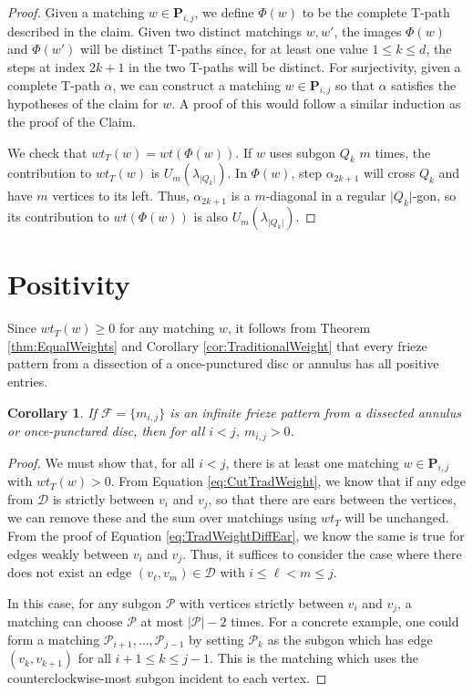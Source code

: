\documentclass[12pt]{article}
\newtheorem{corollary}{Corollary}
\theoremstyle{remark}
\newcommand*{\pathset}[2]{\mathbf{P}_{#1,#2}}
\newcommand*{\poly}[1]{\mathcal{P}_{#1}}
\begin{document}
\begin{proof}
Given a matching $w \in \pathset{i}{j}$, we define $\Phi(w)$ to be the complete T-path described in the claim. Given two distinct matchings $w,w'$, the images $\Phi(w)$ and $\Phi(w')$ will be distinct T-paths since, for at least one value $1 \leq k \leq d$, the steps at index $2k+1$ in the two T-paths will be distinct. For surjectivity, given a complete T-path $\alpha$, we can construct a matching $w \in \pathset{i}{j}$ so that $\alpha$ satisfies the hypotheses of the claim for $w$. A proof of this would follow a similar induction as the proof of the Claim.

We check that $wt_T(w) = wt(\Phi(w))$. If $w$ uses subgon $Q_k$ $m$ times, the contribution to $wt_T(w)$ is $U_{m}(\lambda_{\vert Q_k \vert})$. In $\Phi(w)$, step $\alpha_{2k+1}$ will cross $Q_k$ and have $m$ vertices to its left. Thus, $\alpha_{2k+1}$ is a $m$-diagonal in a regular $\vert Q_k \vert$-gon, so its contribution to $wt(\Phi(w))$ is also $U_{m}(\lambda_{\vert Q_k \vert})$.
\end{proof}



\section{Positivity}\label{sec:Positivity}


Since $wt_T(w) \geq 0$ for any matching $w$, it follows from  Theorem \ref{thm:EqualWeights} and Corollary \ref{cor:TraditionalWeight} that every frieze pattern from a dissection of a once-punctured disc or annulus has all positive entries. 


\begin{corollary}\label{cor:TradWeightPositive}
If $\mathcal{F} = \{m_{i,j}\}$ is an infinite frieze pattern from a dissected annulus or once-punctured disc, then for all $i < j$, $m_{i,j} > 0$.
\end{corollary}

\begin{proof}
We must show that, for all $i < j$, there is at least one matching $w \in \pathset{i}{j}$ with $wt_T(w) > 0$. From Equation  \ref{eq:CutTradWeight}, we know that if any edge from $\mathcal{D}$ is strictly between $v_i$ and $v_j$, so that there are ears between the vertices, we can remove these and the sum over matchings using $wt_T$ will be unchanged. From the proof of Equation \ref{eq:TradWeightDiffEar}, we know the same is true for edges weakly between $v_i$ and $v_j$. Thus, it suffices to consider the case where there does not exist an edge $(v_\ell,v_m) \in \mathcal{D}$ with $i \leq \ell < m \leq j$.

  In this case, for any subgon $\mathcal{P}$ with vertices strictly between $v_i$ and $v_j$, a matching can choose $\mathcal{P}$ at most $\vert \mathcal{P} \vert - 2$ times. For a concrete example, one could form a matching $\poly{i+1},\ldots,\poly{j-1}$ by setting $\poly{k}$ as the subgon which has edge $(v_k, v_{k+1})$ for all $i+1 \leq k \leq j-1$. This is the matching which uses the counterclockwise-most subgon incident to each vertex. 

\end{proof}
\end{document}
